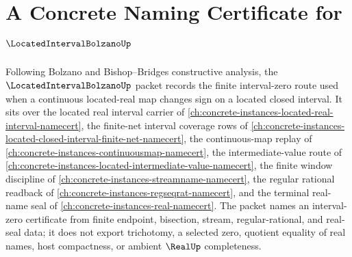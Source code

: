 \chapter{A Concrete Naming Certificate for $\LocatedIntervalBolzanoUp$}
\label{ch:concrete-instances-located-interval-bolzano-namecert}

Following Bolzano and Bishop--Bridges constructive analysis, the $\LocatedIntervalBolzanoUp$ packet records the finite interval-zero route used when a continuous located-real map changes sign on a located closed interval. It sits over the located real interval carrier of \autoref{ch:concrete-instances-located-real-interval-namecert}, the finite-net interval coverage rows of \autoref{ch:concrete-instances-located-closed-interval-finite-net-namecert}, the continuous-map replay of \autoref{ch:concrete-instances-continuousmap-namecert}, the intermediate-value route of \autoref{ch:concrete-instances-located-intermediate-value-namecert}, the finite window discipline of \autoref{ch:concrete-instances-streamname-namecert}, the regular rational readback of \autoref{ch:concrete-instances-regseqrat-namecert}, and the terminal real-name seal of \autoref{ch:concrete-instances-real-namecert}. The packet names an interval-zero certificate from finite endpoint, bisection, stream, regular-rational, and real-seal data; it does not export trichotomy, a selected zero, quotient equality of real names, host compactness, or ambient $\RealUp$ completeness.

